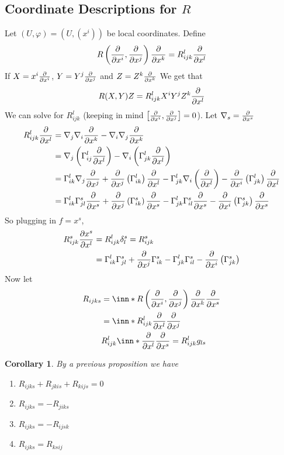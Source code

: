 \documentclass[a4paper]{article}
\newtheorem*{cor}{Corollary}
\begin{document}
\subsection*{Coordinate Descriptions for $R$}%
Let $(U, \varphi) = (U, (x^i))$ be local coordinates. Define 
\[
  R\left(\pdv{x^i},\pdv{x^j}\right) \pdv{x^k} = R_{ijk}^l \pdv{x^l}
\]
If $X = x^i \pdv{x^i}$, $Y = Y^j \pdv{x^j}$ and $Z = Z^k \pdv{x^k}$
We get that
\[
  R(X,Y)Z = R_{ijk}^l X^iY^jZ^k \pdv{x^l}
\]
We can solve for $R_{ijk}^l$ (keeping in mind $\left[ \pdv{x^i}, \pdv{x^j} \right] = 0$). Let $\nabla_s = \pdv{x^s}$
\[
  \begin{aligned}
    R_{ijk}^l \pdv{x^l} &= \nabla_j \nabla_i \pdv{x^k} - \nabla_i \nabla_j \pdv{x^k} \\
                        &= \nabla_j \left( \Gamma_{ij}^l \pdv{x^l} \right) - \nabla_i \left( \Gamma_{jk}^l \pdv{x^l} \right) \\
                        &= \Gamma_{ik}^l \nabla_j \pdv{x^j} + \pdv{x^j} \left( \Gamma_{ik}^l \right)\pdv{x^l} - \Gamma_{jk}^l \nabla_i \left( \pdv{x^l} \right) - \pdv{x^i} \left( \Gamma_{jk}^l \right) \pdv{x^l} \\
                        &= \Gamma_{ik}^l \Gamma_{jl}^s \pdv{x^s} + \pdv{x^j} \left( \Gamma_{ik}^s \right) \pdv{x^s} - \Gamma_{jk}^l \Gamma_{il}^s \pdv{x^s} - \pdv{x^i} \left( \Gamma^s_{jk} \right) \pdv{x^s}
  \end{aligned}
\]
So plugging in $f = x^s$, 
\[
  \begin{aligned}
    R_{ijk}^s\pdv{x^s}{x^l} &= R_{ijk}^l \delta_l^s = R_{ijk}^s \\
                            &= \Gamma_{ik}^l\Gamma_{jl}^s + \pdv{x^j} \Gamma_{ik}^s - \Gamma_{jk}^l \Gamma_{il}^s - \pdv{x^i} \left( \Gamma_{jk}^s \right)
  \end{aligned}
\]
Now let
\[
  \begin{aligned}
    R_{ijks} &= \inn*{R \left( \pdv{x^i}, \pdv{x^j} \right) \pdv{x^k}}{\pdv{x^s}} \\
             &= \inn*{R_{ijk}^l \pdv{x^l}}{ \pdv{x^j}} \\
             & R_{ijk}^l \inn*{\pdv{x^l}}{\pdv{x^s}} = R_{ijk}^l g_{ls}
  \end{aligned}
\]
\begin{cor}
 By a previous proposition we have
 \begin{enumerate}
   \item $R_{ijks} + R_{jkis} + R_{kijs} = 0$
   \item $R_{ijks} = -R_{jiks}$
   \item $R_{ijks} = -R_{ijsk}$ 
   \item $R_{ijks} = R_{ksij}$
 \end{enumerate} 
\end{cor}
\end{document}
